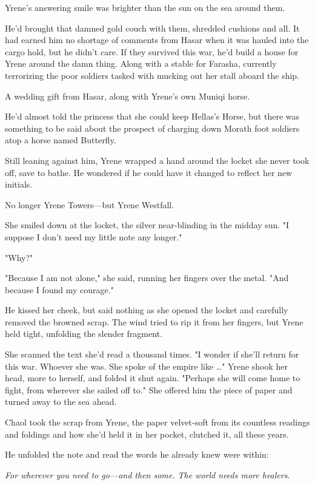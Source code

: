 Yrene's answering smile was brighter than the sun on the sea around them.

He'd brought that damned gold couch with them, shredded cushions and all.
It had earned him no shortage of comments from Hasar when it was hauled into the cargo hold, but he didn't care.
If they survived this war, he'd build a house for Yrene around the damn thing.
Along with a stable for Farasha, currently terrorizing the poor soldiers tasked with mucking out her stall aboard the ship.

A wedding gift from Hasar, along with Yrene's own Muniqi horse.

He'd almost told the princess that she could keep Hellas's Horse, but there was something to be said about the prospect of charging down Morath foot soldiers atop a horse named Butterfly.

Still leaning against him, Yrene wrapped a hand around the locket she never took off, save to bathe.
He wondered if he could have it changed to reflect her new initials.

No longer Yrene Towers---but Yrene Westfall.

She smiled down at the locket, the silver near-blinding in the midday sun.
"I suppose I don't need my little note any longer."

"Why?"

"Because I am not alone," she said, running her fingers over the metal.
"And because I found my courage."

He kissed her cheek, but said nothing as she opened the locket and carefully removed the browned scrap.
The wind tried to rip it from her fingers, but Yrene held tight, unfolding the slender fragment.

She scanned the text she'd read a thousand times.
"I wonder if she'll return for this war.
Whoever she was.
She spoke of the empire like \ldots" Yrene shook her head, more to herself, and folded it shut again.
"Perhaps she will come home to fight, from wherever she sailed off to."
She offered him the piece of paper and turned away to the sea ahead.

Chaol took the scrap from Yrene, the paper velvet-soft from its countless readings and foldings and how she'd held it in her pocket, clutched it, all these years.

He unfolded the note and read the words he already knew were within:

\emph{For wherever you need to go---and then some.
The world needs more healers}.

